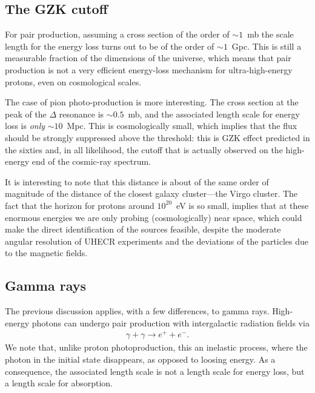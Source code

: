 \subsection{The GZK cutoff}

For pair production, assuming a cross section of the order of
$\sim 1$~mb the scale length for the energy loss turns out to be of the
order of $\sim 1$~Gpc. This is still a measurable fraction of the dimensions of the
universe, which means that pair production is not a very efficient energy-loss
mechanism for ultra-high-energy protons, even on cosmological scales.

The case of pion photo-production is more interesting. The cross section at the
peak of the $\Delta$ resonance is $\sim 0.5$~mb, and the associated length scale
for energy loss is \emph{only} $\sim 10$~Mpc. This is cosmologically small,
which implies that the flux should be strongly suppressed above the threshold: this is
GZK effect predicted in the sixties and, in all likelihood, the cutoff that is
actually observed on the high-energy end of the cosmic-ray spectrum.

It is interesting to note that this distance is about of the same order of magnitude
of the distance of the closest galaxy cluster---the Virgo cluster. The fact that
the horizon for protons around $10^{20}$~eV is so small, implies that at these
enormous energies we are only probing (cosmologically) near space, which could make
the direct identification of the sources feasible, despite the moderate angular
resolution of UHECR experiments and the deviations of the particles due to the
magnetic fields.


\subsection{Gamma rays}

The previous discussion applies, with a few differences, to gamma rays. High-energy
photons can undergo pair production with intergalactic radiation fields via
\begin{align*}
  \gamma + \gamma \rightarrow e^{+} + e^{-}.
\end{align*}
We note that, unlike proton photoproduction, this an inelastic process, where
the photon in the initial state disappears, as opposed to loosing energy. As a
consequence, the associated length scale is not a length scale for energy loss,
but a length scale for absorption.

